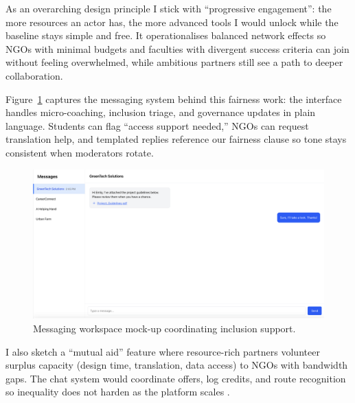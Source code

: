 As an overarching design principle I stick with ``progressive engagement'': the more resources an actor has, the more advanced tools I would unlock while the baseline stays simple and free. It operationalises balanced network effects so NGOs with minimal budgets and faculties with divergent success criteria can join without feeling overwhelmed, while ambitious partners still see a path to deeper collaboration.

Figure~\ref{fig:chat-system} captures the messaging system behind this fairness work: the interface handles micro-coaching, inclusion triage, and governance updates in plain language. Students can flag ``access support needed,'' NGOs can request translation help, and templated replies reference our fairness clause so tone stays consistent when moderators rotate.

\begin{figure}[H]
  \centering
  \includegraphics[width=0.85\linewidth]{figures/Messengersystem.png}
  \caption{Messaging workspace mock-up coordinating inclusion support.}
  \label{fig:chat-system}
\end{figure}

I also sketch a ``mutual aid'' feature where resource-rich partners volunteer surplus capacity (design time, translation, data access) to NGOs with bandwidth gaps. The chat system would coordinate offers, log credits, and route recognition so inequality does not harden as the platform scales \citep{Lecture09}.
